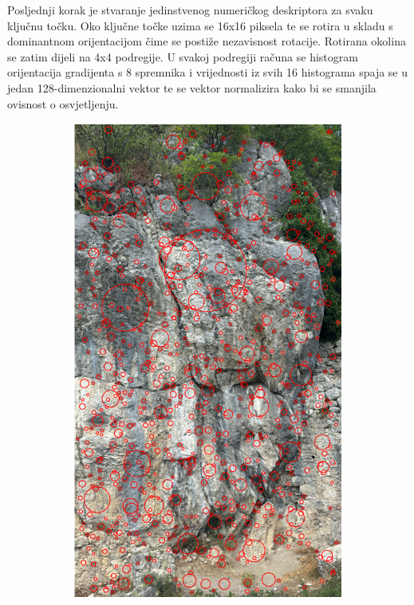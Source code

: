 Posljednji korak je stvaranje jedinstvenog numeričkog deskriptora za svaku ključnu točku. Oko ključne točke uzima se 16x16 piksela te se rotira u skladu s dominantnom orijentacijom čime se postiže nezavisnost rotacije. Rotirana okolina se zatim dijeli na 4x4 podregije. U svakoj podregiji računa se histogram orijentacija gradijenta s 8 spremnika i vrijednosti iz svih 16 histograma spaja se u jedan 128-dimenzionalni vektor te se vektor normalizira kako bi se smanjila ovisnost o osvjetljenju.

\begin{figure}[H]
    \centering
    \begin{subfigure}[b]{0.48\textwidth}
        \centering
        \includegraphics[width=\textwidth]{images/racunalniVid/feature_detection_train.png}

\end{subfigure}
\end{figure}
